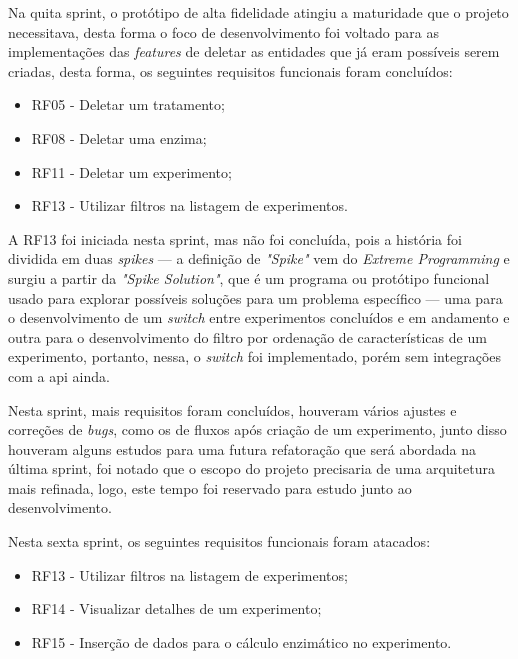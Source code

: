 Na quita sprint, o protótipo de alta fidelidade atingiu a maturidade que o projeto necessitava, desta forma o foco de desenvolvimento foi voltado para as implementações das \textit{features} de deletar as entidades que já eram possíveis serem criadas, desta forma, os seguintes requisitos funcionais foram concluídos:
\begin{itemize}
   \item RF05 - Deletar um tratamento;
   \item RF08 - Deletar uma enzima;
   \item RF11 - Deletar um experimento;
   \item RF13 - Utilizar filtros na listagem de experimentos.
 \end{itemize}

A RF13 foi iniciada nesta sprint, mas não foi concluída, pois a história foi dividida em duas \textit{spikes} — a definição de \textit{"Spike"} vem do \textit{Extreme Programming} e surgiu a partir da \textit{"Spike Solution"}, que é um programa ou protótipo funcional usado para explorar possíveis soluções para um problema específico — uma para o desenvolvimento de um \textit{switch} entre experimentos concluídos e em andamento e outra para o desenvolvimento do filtro por ordenação de características de um experimento, portanto, nessa, o \textit{switch} foi implementado, porém sem integrações com a \ac{api} ainda.

Nesta sprint, mais requisitos foram concluídos, houveram vários ajustes e correções de \textit{bugs}, como os de fluxos após criação de um experimento, junto disso houveram alguns estudos para uma futura refatoração que será abordada na última sprint, foi notado que o escopo do projeto precisaria de uma arquitetura mais refinada, logo, este tempo foi reservado para estudo junto ao desenvolvimento.  
 
Nesta sexta sprint, os seguintes requisitos funcionais foram atacados:
\begin{itemize}
   \item RF13 - Utilizar filtros na listagem de experimentos;
   \item RF14 - Visualizar detalhes de um experimento;
   \item RF15 - Inserção de dados para o cálculo enzimático no experimento.
 \end{itemize}

